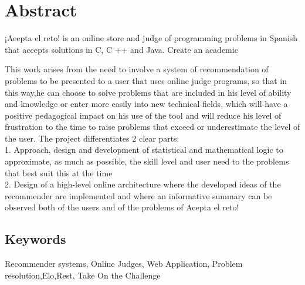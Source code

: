 \chapter*{Abstract}

¡Acepta el reto! is an online store and judge of programming problems in Spanish that accepts solutions in C, C ++ and Java. Create an academic%

This work arises from the need to involve a system of recommendation of problems to be presented to a user that uses online judge programs, so that in this way,he can choose to solve problems that are included in his level of ability and knowledge or enter more easily into new technical fields, which will have a positive pedagogical impact on his use of the tool and will reduce his level of frustration to the time to raise problems that exceed or underestimate the level of the user. The project differentiates 2 clear parts: \\

	1. Approach, design and development of statistical and mathematical logic to approximate, as much as possible, the skill level and user need to the problems that best suit this at the time \\
	
	2. Design of a high-level online architecture where the developed ideas of the recommender are implemented and where an informative summary can be observed both of the users and of the problems of Acepta el reto! \\


\section*{Keywords}

\noindent Recommender systems, Online Judges, Web Application, Problem resolution,Elo,Rest, Take On the Challenge 



